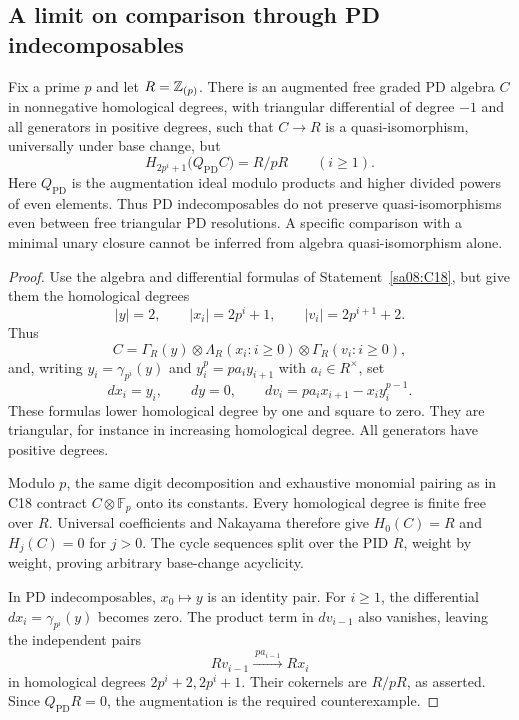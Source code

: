 \subsection{A limit on comparison through PD indecomposables}

\begin{proposition}
\label{sa08:C26}
Fix a prime $p$ and let $R=\mathbb Z_{(p)}$. There is an augmented free
graded PD algebra $C$ in nonnegative homological degrees, with
triangular differential of degree $-1$ and all generators in positive
degrees, such that $C\to R$ is a quasi-isomorphism, universally under
base change, but
\[
 H_{2p^i+1}\bigl(Q_{\mathrm{PD}}C\bigr)=R/pR
 \qquad(i\geq1).
\]
Here $Q_{\mathrm{PD}}$ is the augmentation ideal modulo products
and higher divided powers of even elements. Thus PD indecomposables
do not preserve quasi-isomorphisms even between free triangular PD
resolutions. A specific comparison with a minimal unary closure
cannot be inferred from algebra quasi-isomorphism alone.
\end{proposition}
\begin{proof}
Use the algebra and differential formulas of
Statement~\ref{sa08:C18}, but give them the homological degrees
\[
 |y|=2,\qquad |x_i|=2p^i+1,\qquad
 |v_i|=2p^{i+1}+2.
\]
Thus
\[
 C=\Gamma_R(y)\otimes\Lambda_R(x_i:i\geq0)
           \otimes\Gamma_R(v_i:i\geq0),
\]
and, writing $y_i=\gamma_{p^i}(y)$ and
$y_i^p=p a_i y_{i+1}$ with $a_i\in R^\times$, set
\[
 dx_i=y_i,\qquad dy=0,\qquad
 dv_i=p a_i x_{i+1}-x_i y_i^{p-1}.
\]
These formulas lower homological degree by one and square to zero.
They are triangular, for instance in increasing homological degree.
All generators have positive degrees.

Modulo $p$, the same digit decomposition and exhaustive monomial
pairing as in C18 contract $C\otimes\mathbb F_p$ onto its
constants. Every homological degree is finite free over $R$.
Universal coefficients and Nakayama therefore give $H_0(C)=R$
and $H_j(C)=0$ for $j>0$. The cycle sequences split over the
PID $R$, weight by weight, proving arbitrary base-change acyclicity.

In PD indecomposables, $x_0\mapsto y$ is an identity pair.
For $i\geq1$, the differential
$dx_i=\gamma_{p^i}(y)$ becomes zero. The product term in
$dv_{i-1}$ also vanishes, leaving the independent pairs
\[
 Rv_{i-1}\xrightarrow{\ p a_{i-1}\ }Rx_i
\]
in homological degrees $2p^i+2,2p^i+1$. Their cokernels are
$R/pR$, as asserted. Since $Q_{\mathrm{PD}}R=0$, the
augmentation is the required counterexample.
\end{proof}

